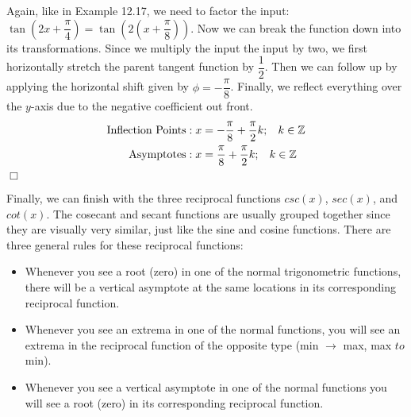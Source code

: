 \documentclass[../book.tex]{subfiles}
\begin{document}
\begin{solution}
Again, like in Example 12.17, we need to factor the input: $\tan\left(2x+\dfrac{\pi}{4}\right)=\tan\left(2\left(x+\dfrac{\pi}{8}\right)\right)$. Now we can break the function down into its transformations. Since we multiply the input the input by two, we first horizontally stretch the parent tangent function by $\dfrac{1}{2}$. Then we can follow up by applying the horizontal shift given by $\phi=-\dfrac{\pi}{8}$. Finally, we reflect everything over the $y$-axis due to the negative coefficient out front. \begin{align*}
    \text{Inflection Points}&: x=-\dfrac{\pi}{8}+\dfrac{\pi}{2}k;\hspace{3mm}k\in\mathbb{Z}\\
    \text{Asymptotes}&: x=\dfrac{\pi}{8}+\dfrac{\pi}{2}k;\hspace{3mm} k\in\mathbb{Z}
\end{align*} $\Box$
\end{solution}
Finally, we can finish with the three reciprocal functions $csc⁡(x)$, $sec⁡(x)$, and $cot⁡(x)$. The cosecant and secant functions are usually grouped together since they are visually very similar, just like the sine and cosine functions. There are three general rules for these reciprocal functions: \begin{itemize}
    \item 	Whenever you see a root (zero) in one of the normal trigonometric functions, there will be a vertical asymptote at the same locations in its corresponding reciprocal function.
	\item Whenever you see an extrema in one of the normal functions, you will see an extrema in the reciprocal function of the opposite type (min $\to$ max, max $to$ min).
	\item Whenever you see a vertical asymptote in one of the normal functions you will see a root (zero) in its corresponding reciprocal function.
\end{itemize}
\end{document}
